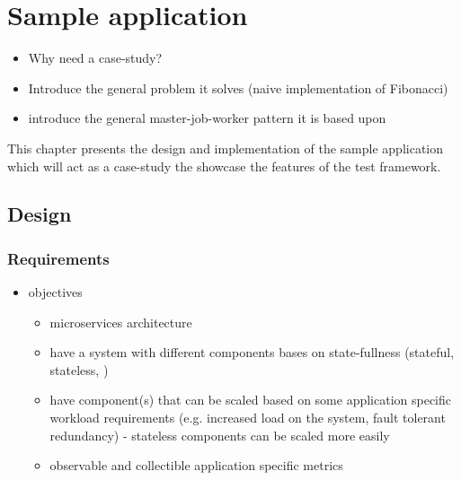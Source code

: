 \chapter{Sample application}

\begin{itemize}
	\item Why need a case-study?
	\item Introduce the general problem it solves (naive implementation of Fibonacci)
	\item introduce the general master-job-worker pattern it is based upon

\end{itemize}

This chapter presents the design and implementation of the sample application which will act as a case-study the showcase the features of the test framework. 


\section{Design}

\subsection{Requirements}

\begin{itemize}
	\item objectives
	\begin{itemize}
		\item microservices architecture
		\item have a system with different components bases on state-fullness (stateful, stateless, )
		\item have component(s) that can be scaled based on some application specific workload requirements (e.g. increased load on the system, fault tolerant redundancy) - stateless components can be scaled more easily
		\item observable and collectible application specific metrics
	\end{itemize}
\end{itemize}

